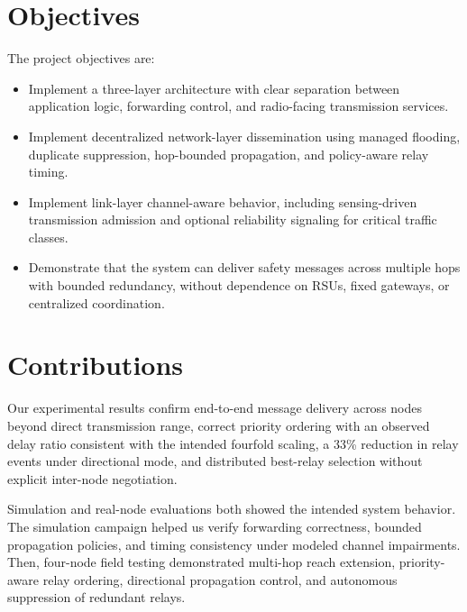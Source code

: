\section{Objectives}

The project objectives are:

\begin{itemize}
	\item Implement a three-layer architecture with clear separation between application logic, forwarding control,
	and radio-facing transmission services.
	\item Implement decentralized network-layer dissemination using managed flooding, duplicate suppression,
	hop-bounded propagation, and policy-aware relay timing.
	\item Implement link-layer channel-aware behavior, including sensing-driven transmission admission and
	optional reliability signaling for critical traffic classes.
	\item Demonstrate that the system can deliver safety messages across multiple hops with bounded redundancy,
	without dependence on RSUs, fixed gateways, or centralized coordination.
\end{itemize}

\section{Contributions}

Our experimental results confirm end-to-end message delivery across nodes beyond direct transmission range,
correct priority ordering with an observed delay ratio consistent with the intended fourfold scaling, a 33\%
reduction in relay events under directional mode, and distributed best-relay selection without explicit inter-node
negotiation.

Simulation and real-node evaluations both showed the intended system behavior. The simulation campaign helped
us verify forwarding correctness, bounded propagation policies, and timing consistency under modeled channel
impairments. Then, four-node field testing demonstrated multi-hop reach extension, priority-aware relay
ordering, directional propagation control, and autonomous suppression of redundant relays.

